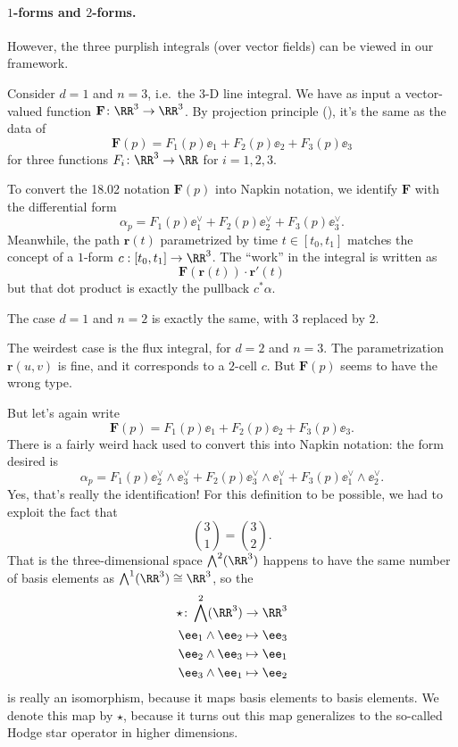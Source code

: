 \paragraph{$1$-forms and $2$-forms.}
However, the three purplish integrals (over vector fields) can be viewed in our framework.
\begin{itemize}
	\ii Consider $d = 1$ and $n = 3$, i.e.\ the 3-D line integral.
	We have as input a vector-valued function $\mathbf{F} \colon \RR^3 \to \RR^3$.
	By projection principle (), it's the same as the data of
	\[ \mathbf{F}(p) = F_1(p) \ee_1 + F_2(p) \ee_2 + F_3(p) \ee_3 \]
	for three functions $F_i \colon \RR^3 \to \RR$ for $i = 1, 2, 3$.

	To convert the 18.02 notation $\mathbf{F}(p)$ into Napkin notation,
	we identify $\mathbf{F}$ with the differential form
	\[ \alpha_p = F_1(p) \ee_1^\vee + F_2(p) \ee_2^\vee + F_3(p) \ee_3^\vee. \]
	Meanwhile, the path $\mathbf{r}(t)$ parametrized by time $t \in [t_0, t_1]$
	matches the concept of a $1$-form $c : [t_0, t_1] \to \RR^3$.
	The ``work'' in the integral is written as
	\[ \mathbf F(\mathbf{r}(t)) \cdot \mathbf{r}'(t) \]
	but that dot product is exactly the pullback $c^\ast\alpha$.

	\ii The case $d = 1$ and $n = 2$ is exactly the same, with $3$ replaced by $2$.

	\ii The weirdest case is the flux integral, for $d = 2$ and $n = 3$.
	The parametrization $\mathbf{r}(u,v)$ is fine, and it corresponds to a $2$-cell $c$.
	But $\mathbf{F}(p)$ seems to have the wrong type.

	But let's again write
	\[ \mathbf{F}(p) = F_1(p) \ee_1 + F_2(p) \ee_2 + F_3(p) \ee_3. \]
	There is a fairly weird hack used to convert this into Napkin notation: the form desired is
	\[ \alpha_p = F_1(p) \ee_2^\vee \wedge \ee_3^\vee
		+ F_2(p) \ee_3^\vee \wedge \ee_1^\vee
		+ F_3(p) \ee_1^\vee \wedge \ee_2^\vee. \]
	Yes, that's really the identification!
	For this definition to be possible, we had to exploit the fact that
	\[ \binom 31 = \binom 32. \]
	That is the three-dimensional space $\bigwedge^2(\RR^3)$
	happens to have the same number of basis elements as $\bigwedge^1(\RR^3) \cong \RR^3$, so the
	\begin{align*}
		\star \colon \bigwedge^2(\RR^3) &\to \RR^3 \\
		\ee_1 \wedge \ee_2 &\mapsto \ee_3 \\
		\ee_2 \wedge \ee_3 &\mapsto \ee_1 \\
		\ee_3 \wedge \ee_1 &\mapsto \ee_2
	\end{align*}
	is really an isomorphism, because it maps basis elements to basis elements.
	We denote this map by $\star$,
	because it turns out this map generalizes to the so-called Hodge star operator in higher dimensions.


\end{itemize}
